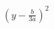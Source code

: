 \documentclass[preview]{standalone}
\begin{document}
\begin{align*}
\left(y-\frac{b}{3a}\right)^2
\end{align*}
\end{document}
